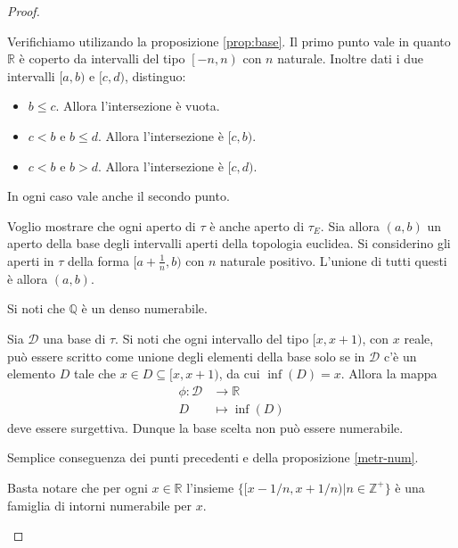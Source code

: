 \begin{proof}
    \begin{nlist}
        \item Verifichiamo utilizando la proposizione \ref{prop:base}. Il primo
        punto vale in quanto $\mathbb{R}$ \`e coperto da intervalli del tipo
        $\left[-n, n\right)$ con $n$ naturale. Inoltre dati i due intervalli
        $[a,b)$ e $[c,d)$, distinguo:
        \begin{itemize}
            \item $b\leq c$. Allora l'intersezione \`e vuota.
            \item $c < b$ e $b \leq d$. Allora l'intersezione \`e $[c,b)$.
            \item $c < b$ e $b > d$. Allora l'intersezione \`e $[c,d)$.
        \end{itemize}
        In ogni caso vale anche il secondo punto.

        \item Voglio mostrare che ogni aperto di $\tau$ \`e anche aperto di
        $\tau_E$. Sia allora $(a, b)$ un aperto della base degli intervalli
        aperti della topologia euclidea. Si considerino gli aperti in $\tau$
        della forma $[a+\frac{1}{n},b)$ con $n$ naturale positivo. L'unione di
        tutti questi \`e allora $(a,b)$.

        \item Si noti che $\mathbb{Q}$ \`e un denso numerabile.

        \item Sia $\mathcal{D}$ una base di $\tau$. Si noti che ogni intervallo
        del tipo $[x,x+1)$, con $x$ reale, pu\`o essere scritto come unione
        degli elementi della base solo se in $\mathcal{D}$ c'\`e un elemento $D$
        tale che $x \in D \subseteq [x, x+1)$, da cui $\inf(D) = x$. Allora la
        mappa
        \begin{align*}
            \phi:\mathcal{D}&\to \mathbb{R}\\
            D & \mapsto \inf(D)
        \end{align*}
        deve essere surgettiva. Dunque la base scelta non pu\`o essere
        numerabile.

        \item Semplice conseguenza dei punti precedenti e della proposizione
        \ref{metr-num}.

				\item Basta notare che per ogni $x \in \mathbb{R}$ l'insieme $\{
				[x-1/n, x+1/n) | n \in \mathbb{Z}^+\}$ è una famiglia di intorni
				numerabile per $x$.
    \end{nlist}
\end{proof}


